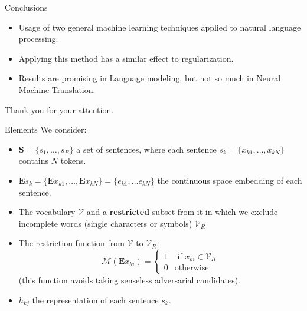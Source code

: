 \documentclass[aspectratio=169]{beamer}
\begin{document}
  
  \begin{frame}{Conclusions}

    \begin{itemize}
      \item Usage of two general machine learning techniques applied to natural language processing.
      \item Applying this method has a similar effect to regularization.
      \item Results are promising in Language modeling, but not so much in Neural Machine Translation.
    \end{itemize}
  \end{frame}
  
  \appendix

  \begin{frame}
    Thank you for your attention.
  \end{frame}


  \begin{frame}[noframenumbering]

  \vspace{0.5cm}
  
  

  \end{frame}

   \begin{frame}[noframenumbering]{Elements}
    We consider:
    
    \begin{itemize}
    \item  \(\mathbf S = \{s_1,\dots,s_B\}\) a set of sentences, where each sentence \(s_k = \{x_{k1},\dots,x_{kN}\}\) contains \(N\) tokens.
    \item \(\mathbf E s_k = \{\mathbf E x_{k1},\dots, \mathbf E x_{kN}\} = \{e_{k1},\dots e_{kN}\}\) the continuous space embedding of each sentence.
    \item The vocabulary \(\mathcal V\) and a \textbf{restricted} subset from it in which we exclude incomplete words (single characters or symbols) \(\mathcal V_R\)
    \item The restriction function from \(\mathcal V\) to \(\mathcal V_R\):
    \[
      \mathcal M (\mathbf E x_{ki}) = \begin{cases}1 & \text{ if } x_{ki}\in \mathcal V_R \\ 0 & \text{otherwise}\end{cases}
    \]
    (this function avoids taking senseless adversarial candidates).

    \item  \(h_{kj}\) the representation of each sentence \(s_k\).

    \end{itemize}
  \end{frame}
\end{document}
